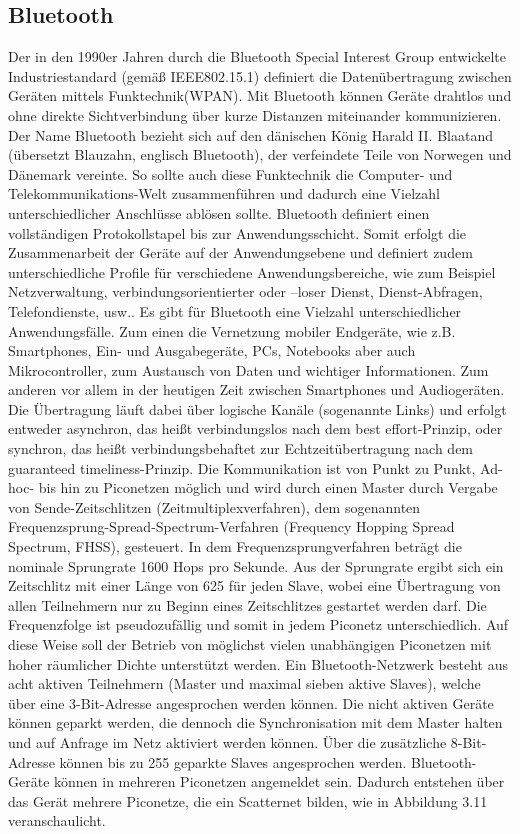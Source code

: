 \subsection{Bluetooth} \label{grund-bluetooth-subsubsec}


Der in den 1990er Jahren durch die Bluetooth Special Interest Group entwickelte Industriestandard (gemäß IEEE802.15.1) definiert die Datenübertragung zwischen Geräten mittels Funktechnik(WPAN). Mit Bluetooth können Geräte drahtlos und ohne direkte Sichtverbindung über kurze Distanzen miteinander kommunizieren. Der Name Bluetooth bezieht sich auf den dänischen König Harald II. Blaatand (übersetzt Blauzahn, englisch Bluetooth), der verfeindete Teile von Norwegen und Dänemark vereinte. So sollte auch diese Funktechnik die Computer- und Telekommunikations-Welt zusammenführen und dadurch eine Vielzahl unterschiedlicher Anschlüsse ablösen sollte. Bluetooth definiert einen vollständigen Protokollstapel bis zur Anwendungsschicht. Somit erfolgt die Zusammenarbeit der Geräte auf der Anwendungsebene und definiert zudem unterschiedliche  Profile für verschiedene Anwendungsbereiche, wie zum Beispiel Netzverwaltung, verbindungsorientierter oder –loser Dienst, Dienst-Abfragen, Telefondienste, usw..
Es gibt für Bluetooth eine Vielzahl unterschiedlicher Anwendungsfälle. Zum einen die Vernetzung mobiler Endgeräte, wie z.B. Smartphones, Ein- und Ausgabegeräte, PCs, Notebooks aber auch Mikrocontroller, zum Austausch von Daten und wichtiger Informationen. Zum anderen vor allem in der heutigen Zeit zwischen Smartphones und Audiogeräten. Die Übertragung läuft dabei über logische Kanäle (sogenannte Links) und erfolgt entweder asynchron, das heißt verbindungslos nach dem best effort-Prinzip, oder synchron, das heißt verbindungsbehaftet zur Echtzeitübertragung nach dem guaranteed timeliness-Prinzip. Die Kommunikation ist von Punkt zu Punkt, Ad-hoc- bis hin zu Piconetzen möglich und wird durch einen Master durch Vergabe von Sende-Zeitschlitzen (Zeitmultiplexverfahren), dem sogenannten Frequenzsprung-Spread-Spectrum-Verfahren (Frequency Hopping Spread Spectrum, FHSS), gesteuert. In dem Frequenzsprungverfahren beträgt die nominale Sprungrate 1600 Hops pro Sekunde. Aus der Sprungrate ergibt sich ein Zeitschlitz mit einer Länge von 625 %
für jeden Slave, wobei eine Übertragung von allen Teilnehmern nur zu Beginn eines Zeitschlitzes gestartet werden darf. Die Frequenzfolge ist pseudozufällig und somit in jedem Piconetz unterschiedlich. Auf diese Weise soll der Betrieb von möglichst vielen unabhängigen Piconetzen mit hoher räumlicher Dichte unterstützt werden. Ein Bluetooth-Netzwerk besteht aus acht aktiven Teilnehmern (Master und maximal sieben aktive Slaves), welche über eine 3-Bit-Adresse angesprochen werden können. Die nicht aktiven Geräte können geparkt werden, die dennoch die Synchronisation mit dem Master halten und auf Anfrage im Netz aktiviert werden können. Über die zusätzliche 8-Bit-Adresse können bis zu 255 geparkte Slaves angesprochen werden. Bluetooth-Geräte können in mehreren Piconetzen angemeldet sein. Dadurch entstehen über das Gerät mehrere Piconetze, die ein Scatternet bilden, wie in Abbildung 3.11 veranschaulicht.
